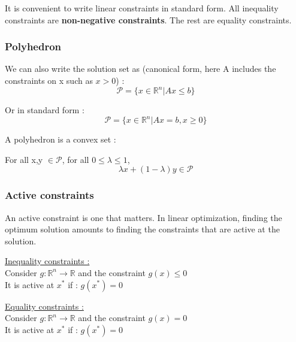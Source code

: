 \documentclass[../main.tex]{subfiles}
\begin{document}
It is convenient to write linear constraints in standard form. All inequality constraints are \textbf{non-negative constraints}. The rest are equality constraints.\\

\subsubsection{Polyhedron}
We can also write the solution set as (canonical form, here A includes the constraints on x such as $x>0$) : \begin{equation}
    \mathcal{P} = \{x \in \mathbb{R}^n | Ax\leq b\}
\end{equation}

Or in standard form : \begin{equation}
    \mathcal{P} = \{x \in \mathbb{R}^n |Ax = b, x\geq 0\}
\end{equation}

\warning A polyhedron is a convex set : \begin{theoremen}
    For all x,y $\in \mathcal{P}$, for all $0\leq \lambda \leq 1$, \begin{equation}
        \lambda x + (1-\lambda)y \in \mathcal{P}
    \end{equation}
\end{theoremen}

\subsubsection{Active constraints}
An active constraint is one that matters. In linear optimization, finding the optimum solution amounts to finding the constraints that are active at the solution.\\

\begin{minipage}{.5\textwidth}
    \underline{Inequality constraints :}\\
    Consider $g:\mathbb{R}^n \rightarrow \mathbb{R}$ and the constraint $g(x)\leq 0$\\
    It is active at $x^*$ if : $g(x^*)=0$\\
\end{minipage}
\vline
 \begin{minipage}{.5\textwidth}
    \underline{Equality constraints :}\\
    Consider $g:\mathbb{R}^n \rightarrow \mathbb{R}$ and the constraint $g(x)= 0$\\
    It is active at $x^*$ if : $g(x^*)=0$\\
\end{minipage}
\end{document}
